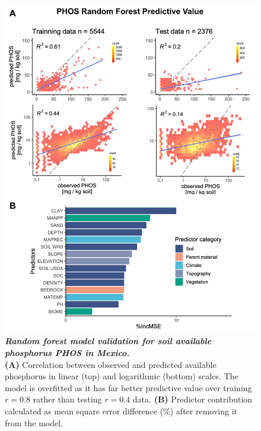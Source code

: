 \begin{figure}[!ht]
\centering
\includegraphics[width=0.9\linewidth]{Chapter-2/figs/rf_validation.png}
\caption[Random forest model validation for soil  available phosphorus PHOS in Mexico]{\textit{\textbf{Random forest model validation for soil  available phosphorus PHOS in Mexico.}}\\\hspace{\textwidth} 
\textbf{(A)} Correlation between observed and predicted available phosphorus in linear (top) and logarithmic (bottom) scales.
The model is overfitted as it has far better predictive value over training $r=0.8$ rather than testing $r=0.4$ data.
\textbf{(B)} Predictor contribution calculated as mean square error difference (\%) after removing it from the model.}
\label{fig::rfvalidation}
\end{figure}
\clearpage





